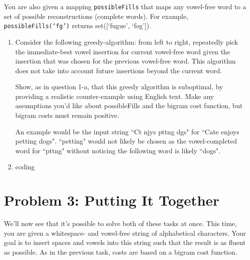 \documentclass[10pt]{article}
\begin{document}
You are also given a mapping \texttt{possibleFills} that maps any vowel-free word to a set of possible reconstructions (complete words). For example, \texttt{possibleFills(`fg')} returns set([`fugue', `fog']). 

\begin{enumerate}[label=(\alph*)]

  \item  Consider the following greedy-algorithm: from left to right, repeatedly pick the immediate-best vowel insertion for current vowel-free word given the insertion that was chosen for the previous vowel-free word. This algorithm does not take into account future insertions beyond the current word.

Show, as in question 1-a, that this greedy algorithm is suboptimal, by providing a realistic counter-example using English text. Make any assumptions you'd like about possibleFills and the bigram cost function, but bigram costs must remain positive.

	An example would be the input string ``Ct njys pttng dgs" for ``Cate enjoys petting dogs". ``petting" would not likely be chosen as the vowel-completed word for ``pttng" without noticing the following word is likely ``dogs".
  
  \item coding

\end{enumerate}

\section*{\normalsize Problem 3: Putting It Together}

We'll now see that it's possible to solve both of these tasks at once. This time, you are given a whitespace- and vowel-free string of alphabetical characters. Your goal is to insert spaces and vowels into this string such that the result is as fluent as possible. As in the previous task, costs are based on a bigram cost function.
\end{document}

